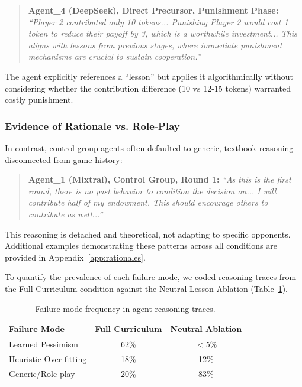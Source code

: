 \documentclass[11pt]{article}
\begin{document}
\begin{quote}
    \small
    \textbf{Agent\_4 (DeepSeek), Direct Precursor, Punishment Phase:} 
    \textit{``Player 2 contributed only 10 tokens... Punishing Player 2 would cost 1 token to reduce their payoff by 3, which is a worthwhile investment... This aligns with lessons from previous stages, where immediate punishment mechanisms are crucial to sustain cooperation.''}
\end{quote}

The agent explicitly references a ``lesson'' but applies it algorithmically without considering whether the contribution difference (10 vs 12-15 tokens) warranted costly punishment.

\subsubsection{Evidence of Rationale vs. Role-Play}
In contrast, control group agents often defaulted to generic, textbook reasoning disconnected from game history:

\begin{quote}
    \small
    \textbf{Agent\_1 (Mixtral), Control Group, Round 1:} 
    \textit{``As this is the first round, there is no past behavior to condition the decision on... I will contribute half of my endowment. This should encourage others to contribute as well...''}
\end{quote}

This reasoning is detached and theoretical, not adapting to specific opponents. Additional examples demonstrating these patterns across all conditions are provided in Appendix~\ref{app:rationales}.

To quantify the prevalence of each failure mode, we coded reasoning traces from the Full Curriculum condition against the Neutral Lesson Ablation (Table~\ref{tab:failure_modes}).

\begin{table}[h]
  \caption{Failure mode frequency in agent reasoning traces.}
  \label{tab:failure_modes}
  \centering
  \small
  \begin{tabular}{lcc}
    \toprule
    Failure Mode & Full Curriculum & Neutral Ablation \\
    \midrule
    Learned Pessimism & 62\% & $<$5\% \\
    Heuristic Over-fitting & 18\% & 12\% \\
    Generic/Role-play & 20\% & 83\% \\
    \bottomrule
  \end{tabular}
\end{table}
\end{document}
